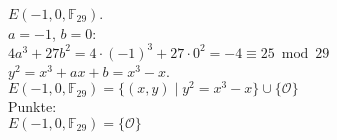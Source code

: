 \documentclass[a4paper, 10pt]{scrartcl}
\begin{document}
$E(-1, 0, \mathbb{F}_{29})$.\\

$a = -1$, $b = 0$:\\
$4a^{3} + 27b^{2} = 4\cdot (-1)^{3} + 27\cdot 0^{2} = -4 \equiv 25\bmod 29$\\
$y^{2} = x^{3} + ax + b = x^{3} - x$.\\

$E(-1, 0, \mathbb{F}_{29}) = \{ (x, y)\mid y^{2} = x^{3} - x \}\cup \{ \mathcal{O} \}$\\

Punkte:\\
$
E(-1, 0, \mathbb{F}_{29}) = \{

\mathcal{O} \}
$\\
\end{document}
